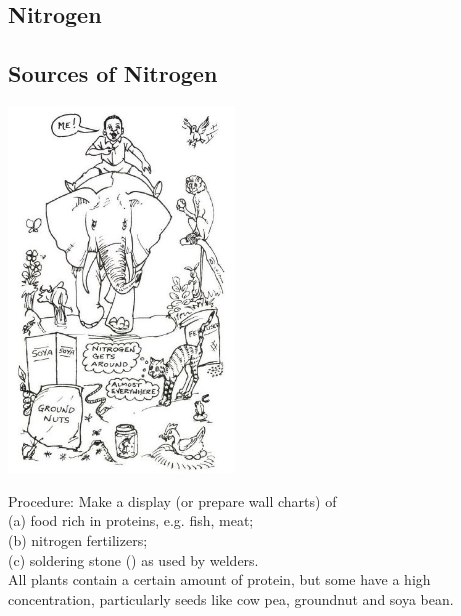 \begin{multicols}{2}

\section*{Nitrogen}


\subsection{Sources of Nitrogen}

\begin{center}
\includegraphics[width=0.45\textwidth]{./img/source/nitrogen-sources.jpg}
\end{center}

\begin{description*}
\item[Procedure:]{Make a display (or prepare wall
charts) of\\
(a) food rich in proteins, e.g. fish, meat;\\
(b) nitrogen fertilizers;\\
(c) soldering stone () as used by welders.\\
All plants contain a certain amount of protein,
but some have a high concentration, particularly
seeds like cow pea, groundnut and soya bean.}
\end{description*}


\end{multicols}
